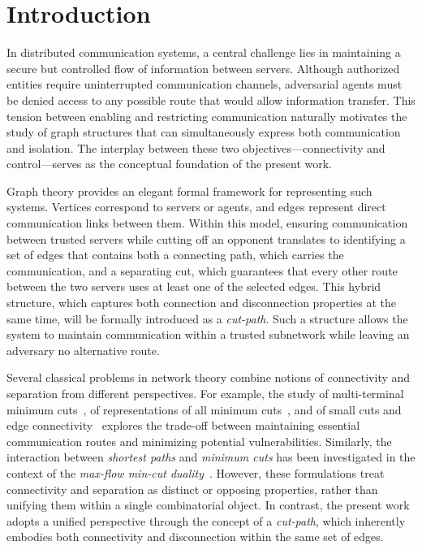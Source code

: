 \section{Introduction}
\label{sec:introduction}

In distributed communication systems, a central challenge lies in maintaining a secure but controlled flow of information between servers.
Although authorized entities require uninterrupted communication channels, adversarial agents must be denied access to any possible route that would allow information transfer.
This tension between enabling and restricting communication naturally motivates the study of graph structures that can simultaneously express both communication and isolation.
The interplay between these two objectives---connectivity and control---serves as the conceptual foundation of the present work.

Graph theory provides an elegant formal framework for representing such systems.
Vertices correspond to servers or agents, and edges represent direct communication links between them.
Within this model, ensuring communication between trusted servers while cutting off an opponent translates to identifying a set of edges that contains both a connecting path, which carries the communication, and a separating cut, which guarantees that every other route between the two servers uses at least one of the selected edges.
This hybrid structure, which captures both connection and disconnection properties at the same time, will be formally introduced as a \emph{cut-path}.
Such a structure allows the system to maintain communication within a trusted subnetwork while leaving an adversary no alternative route.

Several classical problems in network theory combine notions of connectivity and separation from different perspectives.
For example, the study of multi-terminal minimum cuts~\cite{GomoryHu1961}, of representations of all minimum cuts~\cite{NagamochiKameda1996}, and of small cuts and edge connectivity~\cite{Mehlhorn2017Certifying} explores the trade-off between maintaining essential communication routes and minimizing potential vulnerabilities.
Similarly, the interaction between \emph{shortest paths} and \emph{minimum cuts} has been investigated in the context of the \emph{max-flow min-cut duality}~\cite{Cormen2022}.
However, these formulations treat connectivity and separation as distinct or opposing properties, rather than unifying them within a single combinatorial object.
In contrast, the present work adopts a unified perspective through the concept of a \emph{cut-path}, which inherently embodies both connectivity and disconnection within the same set of edges.


